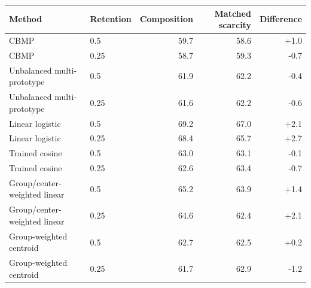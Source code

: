\begin{tabular}{llrrr}
\hline
Method & Retention & Composition & Matched scarcity & Difference \\
\hline
CBMP & 0.5 & 59.7 & 58.6 & +1.0 \\
CBMP & 0.25 & 58.7 & 59.3 & -0.7 \\
Unbalanced multi-prototype & 0.5 & 61.9 & 62.2 & -0.4 \\
Unbalanced multi-prototype & 0.25 & 61.6 & 62.2 & -0.6 \\
Linear logistic & 0.5 & 69.2 & 67.0 & +2.1 \\
Linear logistic & 0.25 & 68.4 & 65.7 & +2.7 \\
Trained cosine & 0.5 & 63.0 & 63.1 & -0.1 \\
Trained cosine & 0.25 & 62.6 & 63.4 & -0.7 \\
Group/center-weighted linear & 0.5 & 65.2 & 63.9 & +1.4 \\
Group/center-weighted linear & 0.25 & 64.6 & 62.4 & +2.1 \\
Group-weighted centroid & 0.5 & 62.7 & 62.5 & +0.2 \\
Group-weighted centroid & 0.25 & 61.7 & 62.9 & -1.2 \\
\hline
\end{tabular}
